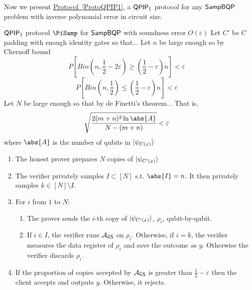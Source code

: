 Now we present \hyperref[ProtoQPIP1]{Protocol~\ref*{ProtoQPIP1}}, a $\operatorname{\mathsf{QPIP}}_1$ protocol for any $\operatorname{\mathsf{SampBQP}}$ problem with inverse polynomial error in circuit size.

\begin{protocol}{$\operatorname{\mathsf{QPIP}}_1$ protocol $\PiSamp$ for $\operatorname{\mathsf{SampBQP}}$ with soundness error $O(\varepsilon)$}
	\label{ProtoQPIP1}
	Let $C'$ be $C$ padding with enough identity gates so that...
	Let $n$ be large enough so by Chernoff bound
		$$P\left[Bin(n, \frac{1}{2}-2\varepsilon)\geq\left(\frac{1}{2}-\varepsilon\right)n\right]<\varepsilon$$
		$$P\left[Bin(n, \frac{1}{2})\leq\left(\frac{1}{2}-\varepsilon\right)n\right]<\varepsilon$$
	Let $N$ be large enough so that by de Finetti's theorem...
		That is,
		$$\sqrt{\frac{2(m+n)^2\ln\abs{A}}{N-(m+n)}}<\varepsilon$$
		where $\abs{A}$ is the number of qubits in $\ket{\psi_{C(x)}}$
	\begin{enumerate}
		\item The honest prover prepares $N$ copies of $\ket{\psi_{C'(x)}}$
		\item The verifier privately samples $I\subset[N]$ s.t. $\abs{I}=n$. It then privately samples $k\in[N]\setminus I$.
		\item For $i$ from $1$ to $N$:
		\begin{enumerate}
			\item The prover sends the $i$-th copy of $\ket{\psi_{C'(x)}}$, $\rho_i$, qubit-by-qubit.
			\item If $i\in I$, the verifier runs $\mathcal{A}_{\mathsf{GS}}$ on $\rho_i$. Otherwise, if $i=k$, the verifier measures the data register of $\rho_i$ and save the outcome as $y$. Otherwise the verifier discards $\rho_i$.
		\end{enumerate}
		\item If the proportion of copies accepted by $\mathcal{A}_{\mathsf{GS}}$ is greater than $\frac{1}{2}-\varepsilon$ then the client accepts and outputs $y$. Otherwise, it rejects.
	\end{enumerate}
\end{protocol}

